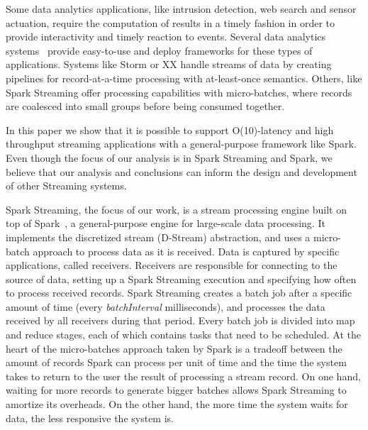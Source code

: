 \noindent

Some data analytics applications, like intrusion detection, web search and sensor actuation,
require the computation of results in a timely fashion in order to provide interactivity and timely reaction to events.
Several data analytics systems~\cite{Babu:2001:CQO:603867.603884,TelegraphCQ,Storm,SparkStreaming,Trill,Naiad,Niagara,StreamInsight,Carney:2002:MSN:1287369.1287389,Sullivan:1998:TSM:1268256.1268258,Condie:2010:MO:1855711.185573,Brito:2011:SLD:2114498.2116192} provide easy-to-use and deploy frameworks for these types of applications. 
Systems like Storm or XX  handle streams of data by creating pipelines for record-at-a-time processing with at-least-once semantics. 
Others, like Spark Streaming offer processing capabilities with micro-batches, where records are coalesced into small groups before being consumed together.

In this paper we show that it is possible to support O(10)-latency and high throughput streaming applications with a general-purpose framework like Spark.
Even though the focus of our analysis is in Spark Streaming and Spark, we believe that our analysis and conclusions can inform the design and development of other Streaming systems.


%
%
Spark Streaming, the focus of our work, is a stream processing engine built on top of Spark~\cite{Spark}, a general-purpose engine for large-scale data processing. 
It implements the discretized stream (D-Stream) abstraction, and uses a micro-batch approach to process data as it is received. 
Data is captured by specific applications, called receivers. 
Receivers are responsible for connecting to the source of data, setting up a Spark Streaming execution and specifying how often to process received records. 
Spark Streaming creates a batch job after a specific amount of time (every  \emph{batchInterval} milliseconds), and processes the data received by all receivers during that period. 
Every batch job is divided into map and reduce stages, each of which contains tasks that need to be scheduled.
At the heart of the micro-batches approach taken by Spark is a tradeoff between the amount of records Spark can process per unit of time and the time the system takes to return to the user the result of processing a stream record.
On one hand, waiting for more records to generate bigger batches allows Spark Streaming to amortize its overheads. On the other hand, the more time the system waits for data, the less responsive the system is.

